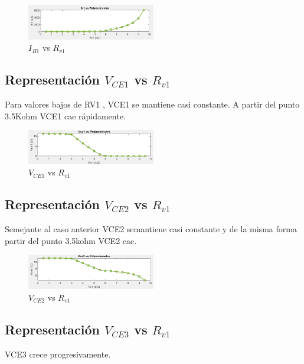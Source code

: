 \documentclass[conference]{IEEEtran}
\begin{document}
    \begin{figure}[h]
        \centering
        \includegraphics[width=0.5\textwidth]{media/IMAGENES MATLAB/IB1_R.png}
        \caption{$I_{B1}$ vs $R_{v1}$ }
        \label{fig:Ib1}
    \end{figure}
    
    \subsection{ Representación $V_{CE1}$ vs $R_{v1}$}
    Para valores bajos de RV1 , VCE1 se mantiene casi constante. A partir del punto 3.5Kohm VCE1 cae rápidamente.
    \begin{figure}[h]
        \centering
        \includegraphics[width=0.5\textwidth]{media/IMAGENES MATLAB/VCE1_R.png}
        \caption{$V_{CE1}$ vs $R_{v1}$}
        \label{fig:Vce1}
    \end{figure}
    
    \subsection{ Representación $V_{CE2}$ vs $R_{v1}$}
    Semejante al caso anterior VCE2 semantiene casi constante y de la misma forma partir del punto 3.5kohm VCE2 cae. 
    \begin{figure}[h]
        \centering
        \includegraphics[width=0.5\textwidth]{media/IMAGENES MATLAB/VCE2_R.png}
        \caption{$V_{CE2}$ vs $R_{v1}$}
        \label{fig:vce2}
    \end{figure}
    
    \subsection{ Representación $V_{CE3}$ vs $R_{v1}$}
    VCE3 crece progresivamente.
    
\end{document}
